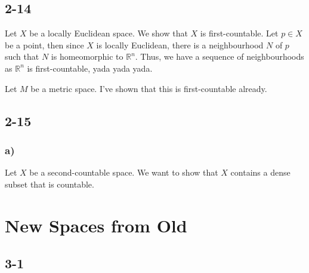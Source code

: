 \documentclass[a4paper]{book}
\theoremstyle{definition}
\begin{document}
\section*{2-14}
Let \(X\) be a locally Euclidean space. We show that \(X\) is first-countable. Let \(p \in X\) be a point, then since \(X\) is locally Euclidean, there is a neighbourhood \(N\) of \(p\) such that \(N\) is homeomorphic to \(\mathbb{R}^n\). Thus, we have a sequence of neighbourhoods as \(\mathbb{R}^n\) is first-countable, yada yada yada.

\noindent Let \(M\) be a metric space. I've shown that this is first-countable already.

\section*{2-15}
\subsection*{a)}
Let \(X\) be a second-countable space. We want to show that \(X\) contains a dense subset that is countable.

\chapter{New Spaces from Old}
\section*{3-1}
\end{document}
